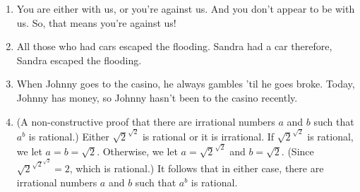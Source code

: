 \documentclass[10pt,]{book}
\theoremstyle{plain}
\theoremstyle{definition}
\theoremstyle{definition}
\numberwithin{equation}{section}
\newcommand{\hrulethin}  {\noalign{\hrule height 0.04em}}
\newcommand{\hint}[1]{ }
\begin{document}
\begin{enumerate}[label=(\alph*)]
\begin{enumerate}[label=\roman*.]
\item\hypertarget{li-202}{}
          You are either with us, or you're against us.  And you don't appear to be with us.
          So, that means you're against us!

          \hint{
          \begin{tabular}{ll}
&\(W \lor A\)\tabularnewline[0pt]
&\({\lnot}W\)\tabularnewline[0pt]
&\tabularnewline\hrulethin
\(\therefore\)&\(A\)
\end{tabular}

          This is ``disjunctive syllogism.''
          }
\item\hypertarget{li-203}{}
          All those who had cars escaped the flooding.  Sandra had a car \textemdash{} therefore, Sandra
          escaped the flooding.

          \hint{
          Let \(C(x)\) be the open sentence ``x has a car'' and let \(E(x)\) be the open sentence ``x escaped the flooding.''
          This argument is actually the particular form of universal modus ponens: (See the final question in the next set of exercises.)
          \begin{tabular}{ll}
&\(\forall x, C(x) \implies E(x)\)\tabularnewline[0pt]
&\(C(\mbox{Sandra} )\)\tabularnewline[0pt]
&\tabularnewline\hrulethin
\(\therefore\)&\(E(\mbox{Sandra} )\)
\end{tabular}

          At this stage in the game it would be perfectly fine to just identify this as modus ponens and not worry about the quantifiers that appear.
          }
\item\hypertarget{li-204}{}
          When Johnny goes to the casino, he always gambles 'til he goes broke.  Today, Johnny
          has money, so Johnny hasn't been to the casino recently.
\item\hypertarget{li-205}{}
          (A non-constructive proof that there are 
          irrational numbers \(a\) and \(b\) such that \(a^b\) is rational.)  
          Either \(\sqrt{2}^{\sqrt{2}}\) is rational or it is irrational.
          If \(\sqrt{2}^{\sqrt{2}}\) is rational, we let \(a=b=\sqrt{2}\).
          Otherwise, we let \(a=\sqrt{2}^{\sqrt{2}}\) and \(b=\sqrt{2}\).
          (Since \(\sqrt{2}^{\sqrt{2}^{\sqrt{2}}} = 2\), which is rational.) It follows that in either case, there
          are irrational numbers \(a\) and \(b\) such that \(a^b\) is rational.
\end{enumerate}

\end{enumerate}
\typeout{************************************************}
\typeout{************************************************}
\end{document}
